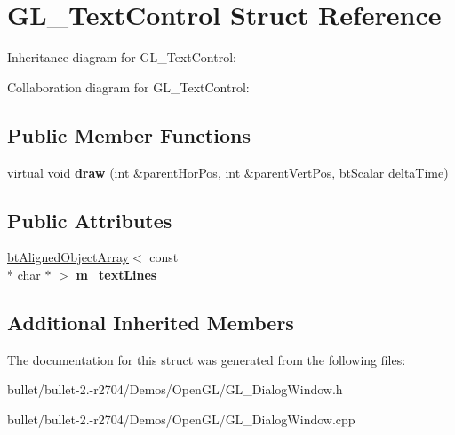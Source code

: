 \hypertarget{struct_g_l___text_control}{\section{G\+L\+\_\+\+Text\+Control Struct Reference}
\label{struct_g_l___text_control}
}


Inheritance diagram for G\+L\+\_\+\+Text\+Control\+:


Collaboration diagram for G\+L\+\_\+\+Text\+Control\+:
\subsection*{Public Member Functions}
\begin{DoxyCompactItemize}
\item 
\hypertarget{struct_g_l___text_control_a40d019c53a063c5c26c1993cf811e153}{virtual void {\bfseries draw} (int \&parent\+Hor\+Pos, int \&parent\+Vert\+Pos, bt\+Scalar delta\+Time)}\label{struct_g_l___text_control_a40d019c53a063c5c26c1993cf811e153}

\end{DoxyCompactItemize}
\subsection*{Public Attributes}
\begin{DoxyCompactItemize}
\item 
\hypertarget{struct_g_l___text_control_a8215afbb6048922a1ae0b54ab87fcefd}{\hyperlink{classbt_aligned_object_array}{bt\+Aligned\+Object\+Array}$<$ const \\*
char $\ast$ $>$ {\bfseries m\+\_\+text\+Lines}}\label{struct_g_l___text_control_a8215afbb6048922a1ae0b54ab87fcefd}

\end{DoxyCompactItemize}
\subsection*{Additional Inherited Members}


The documentation for this struct was generated from the following files\+:\begin{DoxyCompactItemize}
\item 
bullet/bullet-\/2.-\/r2704/\+Demos/\+Open\+G\+L/G\+L\+\_\+\+Dialog\+Window.\+h\item 
bullet/bullet-\/2.-\/r2704/\+Demos/\+Open\+G\+L/G\+L\+\_\+\+Dialog\+Window.\+cpp\end{DoxyCompactItemize}
